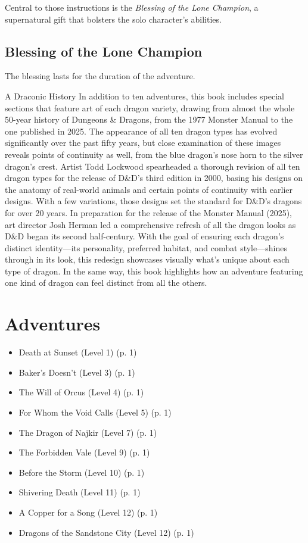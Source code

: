 \documentclass[letterpaper, 11pt, twocolumn]{dndbook}
\begin{document}
Central to those instructions is the \textit{Blessing of the Lone Champion}, a supernatural gift that bolsters the solo character's abilities.

\subsection{Blessing of the Lone Champion}

The blessing lasts for the duration of the adventure.

\begin{DndSidebar}{A Draconic History}
In addition to ten adventures, this book includes special sections that feature art of each dragon variety, drawing from almost the whole 50-year history of Dungeons \& Dragons, from the 1977 Monster Manual to the one published in 2025. The appearance of all ten dragon types has evolved significantly over the past fifty years, but close examination of these images reveals points of continuity as well, from the blue dragon's nose horn to the silver dragon's crest.
Artist Todd Lockwood spearheaded a thorough revision of all ten dragon types for the release of D\&D's third edition in 2000, basing his designs on the anatomy of real-world animals and certain points of continuity with earlier designs. With a few variations, those designs set the standard for D\&D's dragons for over 20 years.
In preparation for the release of the Monster Manual (2025), art director Josh Herman led a comprehensive refresh of all the dragon looks as D\&D began its second half-century. With the goal of ensuring each dragon's distinct identity---its personality, preferred habitat, and combat style---shines through in its look, this redesign showcases visually what's unique about each type of dragon.
In the same way, this book highlights how an adventure featuring one kind of dragon can feel distinct from all the others.
\end{DndSidebar}
\section{Adventures}

\begin{itemize}
\item Death at Sunset (Level 1) (p. 1)
\item Baker's Doesn't (Level 3) (p. 1)
\item The Will of Orcus (Level 4) (p. 1)
\item For Whom the Void Calls (Level 5) (p. 1)
\item The Dragon of Najkir (Level 7) (p. 1)
\item The Forbidden Vale (Level 9) (p. 1)
\item Before the Storm (Level 10) (p. 1)
\item Shivering Death (Level 11) (p. 1)
\item A Copper for a Song (Level 12) (p. 1)
\item Dragons of the Sandstone City (Level 12) (p. 1)
\end{itemize}
\end{document}
